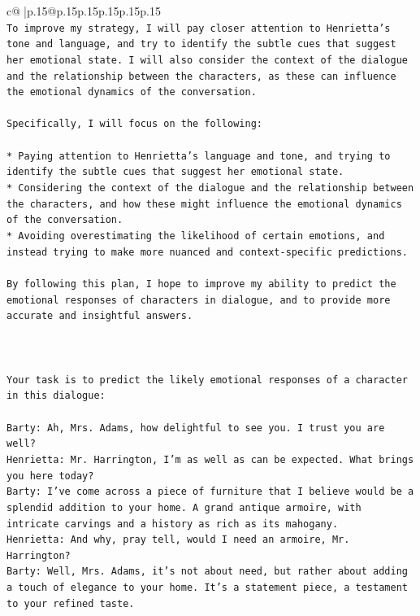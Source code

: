 \documentclass{article}
\begin{document}
{\begin{supertabular}{c@{$\;$}|p{.15\linewidth}@{}p{.15\linewidth}p{.15\linewidth}p{.15\linewidth}p{.15\linewidth}p{.15\linewidth}}
{{{\\ 
\texttt{To improve my strategy, I will pay closer attention to Henrietta's tone and language, and try to identify the subtle cues that suggest her emotional state. I will also consider the context of the dialogue and the relationship between the characters, as these can influence the emotional dynamics of the conversation. } \\
\\ 
\texttt{Specifically, I will focus on the following:} \\
\\ 
\texttt{* Paying attention to Henrietta's language and tone, and trying to identify the subtle cues that suggest her emotional state.} \\
\texttt{* Considering the context of the dialogue and the relationship between the characters, and how these might influence the emotional dynamics of the conversation.} \\
\texttt{* Avoiding overestimating the likelihood of certain emotions, and instead trying to make more nuanced and context{-}specific predictions.} \\
\\ 
\texttt{By following this plan, I hope to improve my ability to predict the emotional responses of characters in dialogue, and to provide more accurate and insightful answers.} \\
\\ 
\\ 
\\ 
\texttt{Your task is to predict the likely emotional responses of a character in this dialogue:} \\
\\ 
\texttt{Barty: Ah, Mrs. Adams, how delightful to see you. I trust you are well?} \\
\texttt{Henrietta: Mr. Harrington, I'm as well as can be expected. What brings you here today?} \\
\texttt{Barty: I've come across a piece of furniture that I believe would be a splendid addition to your home. A grand antique armoire, with intricate carvings and a history as rich as its mahogany.} \\
\texttt{Henrietta: And why, pray tell, would I need an armoire, Mr. Harrington?} \\
\texttt{Barty: Well, Mrs. Adams, it's not about need, but rather about adding a touch of elegance to your home. It's a statement piece, a testament to your refined taste.} \\
}}}
\end{supertabular}}
\end{document}
